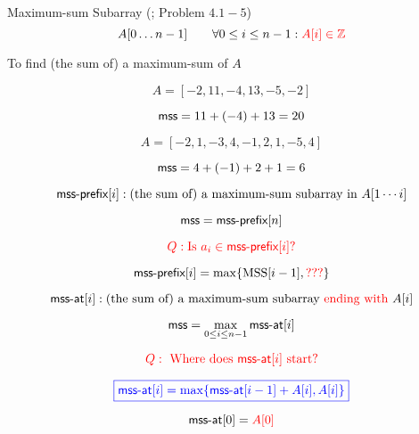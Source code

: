 
\begin{frame}{}
  \begin{exampleblock}{Maximum-sum Subarray (\mss; Problem $4.1-5$)}
    \[
      A[0 \ldots n-1] \qquad \forall 0 \le i \le n-1: \textcolor{red}{A[i] \in \mathbb{Z}}
    \]

    \pause
    \begin{center}
      To find (the sum of) a maximum-sum  of $A$
    \end{center}
  \end{exampleblock}

  \pause
  \[
    A = [-2, 11, -4, 13, -5, -2]
  \]

  \pause
  \vspace{-0.30cm}
  \[
    \textsf{mss} = 11 + (-4) + 13 = 20
  \]
  
  \pause
  \[
    A = [-2, 1, -3, 4, -1, 2, 1, -5, 4]
  \]

  \pause
  \vspace{-0.30cm}
  \[
    \textsf{mss} = 4 + (-1) + 2 + 1 = 6
  \]
\end{frame}

\begin{frame}{}
  \[
    \textsf{mss-prefix}[i]: \text{(the sum of) a maximum-sum subarray in } A[1 \cdots i]
  \]

  \pause
  \[
    \textsf{mss} = \textsf{mss-prefix}[n]
  \]

  \pause
  \[
    \textcolor{red}{Q: \text{Is } a_{i} \in \textsf{mss-prefix}[i]?}
  \]
  
  \pause
  \[ 
    \textsf{mss-prefix}[i] = \max \{\text{MSS}[i-1], \textcolor{red}{???}\}
  \]
\end{frame}

\begin{frame}{}
  \[
    \textsf{mss-at}[i]: \text{(the sum of) a maximum-sum subarray \textcolor{red}{ending with }} A[i]
  \]

  \pause
  \[
    \textsf{mss} = \max_{0 \le i \le n-1} \textsf{mss-at}[i]
  \]

  \pause
  \[
    \textcolor{red}{Q: \text{ Where does } \textsf{mss-at}[i] \text{ start}?}
  \]

  \pause
  \[
    \textcolor{blue}{\boxed{\textsf{mss-at}[i] = \max \{\textsf{mss-at}[i-1] + A[i], A[i]\}}}
  \]

  \pause
  \[
    \textsf{mss-at}[0] = \textcolor{red}{A[0]}
  \]

\end{frame}

